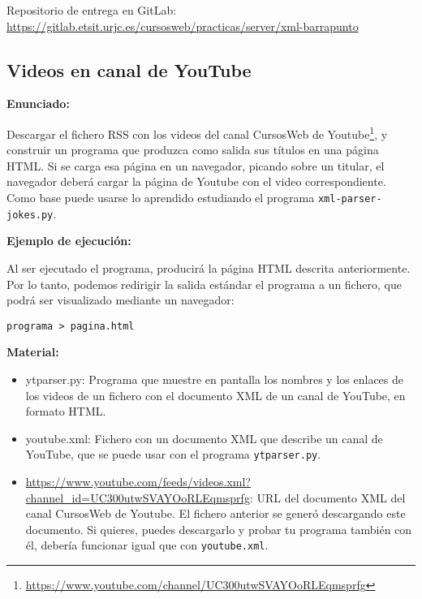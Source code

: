 Repositorio de entrega en GitLab: \\
\url{https://gitlab.etsit.urjc.es/cursosweb/practicas/server/xml-barrapunto}


\subsection{Videos en canal de YouTube}
\label{subsec:xml-youtube}

\textbf{Enunciado:}

Descargar el fichero RSS con los videos del canal CursosWeb de Youtube\footnote{\url{https://www.youtube.com/channel/UC300utwSVAYOoRLEqmsprfg}}, y construir un programa que produzca como salida sus títulos en una página HTML. Si se carga esa página en un navegador,  picando sobre un titular, el navegador deberá cargar la página de Youtube con el video correspondiente. Como base puede usarse lo aprendido estudiando el programa \verb|xml-parser-jokes.py|.

\textbf{Ejemplo de ejecución:}

Al ser ejecutado el programa, producirá la página HTML descrita anteriormente. Por lo tanto, podemos redirigir la salida estándar el programa a un fichero, que podrá ser visualizado mediante un navegador:

\begin{verbatim}
programa > pagina.html
\end{verbatim}

\textbf{Material:}

\begin{itemize}
\item ytparser.py: Programa que muestre en pantalla los nombres y los enlaces de los videos de un fichero con el documento XML de un canal de YouTube, en formato HTML.
\item youtube.xml: Fichero con un documento XML que describe un canal de YouTube, que se puede usar con el programa \verb|ytparser.py|.
\item \url{https://www.youtube.com/feeds/videos.xml?channel_id=UC300utwSVAYOoRLEqmsprfg}: URL del documento XML del canal CursosWeb de Youtube. El fichero anterior se generó descargando este documento. Si quieres, puedes descargarlo y probar tu programa también con él, debería funcionar igual que con \verb|youtube.xml|.
\end{itemize}


